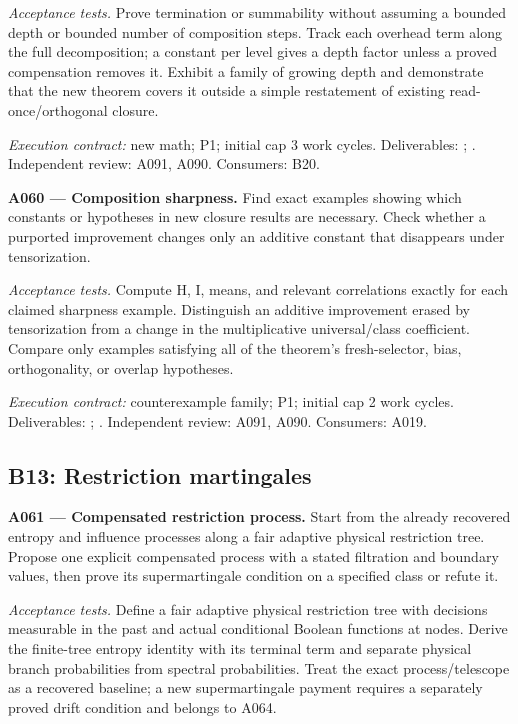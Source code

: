 \documentclass[11pt]{article}
\begin{document}
\emph{Acceptance tests.} Prove termination or summability without assuming a bounded depth or bounded number of composition steps. Track each overhead term along the full decomposition; a constant per level gives a depth factor unless a proved compensation removes it. Exhibit a family of growing depth and demonstrate that the new theorem covers it outside a simple restatement of existing read-once/orthogonal closure.

{\small\emph{Execution contract:} new math; P1; initial cap 3 work cycles. Deliverables: ; . Independent review: A091, A090. Consumers: B20.}

\textbf{A060 --- Composition sharpness.} Find exact examples showing which constants or hypotheses in new closure results are necessary. Check whether a purported improvement changes only an additive constant that disappears under tensorization.

\emph{Acceptance tests.} Compute H, I, means, and relevant correlations exactly for each claimed sharpness example. Distinguish an additive improvement erased by tensorization from a change in the multiplicative universal/class coefficient. Compare only examples satisfying all of the theorem's fresh-selector, bias, orthogonality, or overlap hypotheses.

{\small\emph{Execution contract:} counterexample family; P1; initial cap 2 work cycles. Deliverables: ; . Independent review: A091, A090. Consumers: A019.}

\subsection{B13: Restriction martingales}

\textbf{A061 --- Compensated restriction process.} Start from the already recovered entropy and influence processes along a fair adaptive physical restriction tree. Propose one explicit compensated process with a stated filtration and boundary values, then prove its supermartingale condition on a specified class or refute it.

\emph{Acceptance tests.} Define a fair adaptive physical restriction tree with decisions measurable in the past and actual conditional Boolean functions at nodes. Derive the finite-tree entropy identity with its terminal term and separate physical branch probabilities from spectral probabilities. Treat the exact process/telescope as a recovered baseline; a new supermartingale payment requires a separately proved drift condition and belongs to A064.
\end{document}

